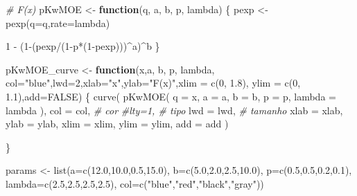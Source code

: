 \documentclass[
]{article}
\newenvironment{Shaded}{\begin{snugshade}}{\end{snugshade}}
\newcommand{\AttributeTok}[1]{\textcolor[rgb]{0.77,0.63,0.00}{#1}}
\newcommand{\CommentTok}[1]{\textcolor[rgb]{0.56,0.35,0.01}{\textit{#1}}}
\newcommand{\ConstantTok}[1]{\textcolor[rgb]{0.00,0.00,0.00}{#1}}
\newcommand{\ControlFlowTok}[1]{\textcolor[rgb]{0.13,0.29,0.53}{\textbf{#1}}}
\newcommand{\DecValTok}[1]{\textcolor[rgb]{0.00,0.00,0.81}{#1}}
\newcommand{\FloatTok}[1]{\textcolor[rgb]{0.00,0.00,0.81}{#1}}
\newcommand{\FunctionTok}[1]{\textcolor[rgb]{0.00,0.00,0.00}{#1}}
\newcommand{\NormalTok}[1]{#1}
\newcommand{\OtherTok}[1]{\textcolor[rgb]{0.56,0.35,0.01}{#1}}
\newcommand{\SpecialCharTok}[1]{\textcolor[rgb]{0.00,0.00,0.00}{#1}}
\newcommand{\StringTok}[1]{\textcolor[rgb]{0.31,0.60,0.02}{#1}}
\begin{document}
\begin{Shaded}
\begin{Highlighting}[]
\CommentTok{\# F(x)}
\NormalTok{pKwMOE }\OtherTok{\textless{}{-}} \ControlFlowTok{function}\NormalTok{(q, a, b, p, lambda)}
\NormalTok{\{}
\NormalTok{    pexp }\OtherTok{\textless{}{-}} \FunctionTok{pexp}\NormalTok{(}\AttributeTok{q=}\NormalTok{q,}\AttributeTok{rate=}\NormalTok{lambda)}
    
    \DecValTok{1} \SpecialCharTok{{-}}\NormalTok{ (}\DecValTok{1}\SpecialCharTok{{-}}\NormalTok{(pexp}\SpecialCharTok{/}\NormalTok{(}\DecValTok{1}\SpecialCharTok{{-}}\NormalTok{p}\SpecialCharTok{*}\NormalTok{(}\DecValTok{1}\SpecialCharTok{{-}}\NormalTok{pexp)))}\SpecialCharTok{\^{}}\NormalTok{a)}\SpecialCharTok{\^{}}\NormalTok{b}
\NormalTok{\}}


\NormalTok{pKwMOE\_curve }\OtherTok{\textless{}{-}} \ControlFlowTok{function}\NormalTok{(x,a, b, p, lambda,}
                         \AttributeTok{col=}\StringTok{"blue"}\NormalTok{,}\AttributeTok{lwd=}\DecValTok{2}\NormalTok{,}\AttributeTok{xlab=}\StringTok{"x"}\NormalTok{,}\AttributeTok{ylab=}\StringTok{"F(x)"}\NormalTok{,}\AttributeTok{xlim =} \FunctionTok{c}\NormalTok{(}\DecValTok{0}\NormalTok{, }\FloatTok{1.8}\NormalTok{), }\AttributeTok{ylim =} \FunctionTok{c}\NormalTok{(}\DecValTok{0}\NormalTok{, }\FloatTok{1.1}\NormalTok{),}\AttributeTok{add=}\ConstantTok{FALSE}\NormalTok{) \{}
    \FunctionTok{curve}\NormalTok{(}
        \FunctionTok{pKwMOE}\NormalTok{(}
            \AttributeTok{q =}\NormalTok{ x,}
            \AttributeTok{a =}\NormalTok{ a,}
            \AttributeTok{b =}\NormalTok{ b,}
            \AttributeTok{p =}\NormalTok{ p,}
            \AttributeTok{lambda =}\NormalTok{ lambda}
\NormalTok{        ),}
        \AttributeTok{col =}\NormalTok{ col, }\CommentTok{\# cor}
        \CommentTok{\#lty=1, \# tipo}
        \AttributeTok{lwd =}\NormalTok{ lwd, }\CommentTok{\# tamanho}
        \AttributeTok{xlab =}\NormalTok{ xlab,}
        \AttributeTok{ylab =}\NormalTok{ ylab,}
        \AttributeTok{xlim =}\NormalTok{ xlim,}
        \AttributeTok{ylim =}\NormalTok{ ylim,}
        \AttributeTok{add =}\NormalTok{ add}
\NormalTok{    )}
    
\NormalTok{\}}


\NormalTok{params }\OtherTok{\textless{}{-}} \FunctionTok{list}\NormalTok{(}\AttributeTok{a=}\FunctionTok{c}\NormalTok{(}\FloatTok{12.0}\NormalTok{,}\FloatTok{10.0}\NormalTok{,}\FloatTok{0.5}\NormalTok{,}\FloatTok{15.0}\NormalTok{),}
               \AttributeTok{b=}\FunctionTok{c}\NormalTok{(}\FloatTok{5.0}\NormalTok{,}\FloatTok{2.0}\NormalTok{,}\FloatTok{2.5}\NormalTok{,}\FloatTok{10.0}\NormalTok{),}
               \AttributeTok{p=}\FunctionTok{c}\NormalTok{(}\FloatTok{0.5}\NormalTok{,}\FloatTok{0.5}\NormalTok{,}\FloatTok{0.2}\NormalTok{,}\FloatTok{0.1}\NormalTok{),}
               \AttributeTok{lambda=}\FunctionTok{c}\NormalTok{(}\FloatTok{2.5}\NormalTok{,}\FloatTok{2.5}\NormalTok{,}\FloatTok{2.5}\NormalTok{,}\FloatTok{2.5}\NormalTok{),}
               \AttributeTok{col=}\FunctionTok{c}\NormalTok{(}\StringTok{"blue"}\NormalTok{,}\StringTok{"red"}\NormalTok{,}\StringTok{"black"}\NormalTok{,}\StringTok{"gray"}\NormalTok{))}


\end{Highlighting}
\end{Shaded}
\end{document}

